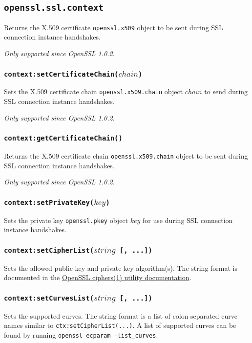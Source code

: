 \documentclass[11pt, oneside]{memoir}
\newcommand*{\fn}[1]{\texttt{#1}\xspace}
\newcommand*{\module}[1]{\texttt{#1}\xspace}
\newcounter{toccols}
\newenvironment{Module}[1]{
	\subsection{\texttt{#1}}
	\addtocontents{toc}{
		\protect\begin{multicols}{\value{toccols}}
	}
}{
	\addtocontents{toc}{\protect\end{multicols}}
}
\begin{document}
\begin{Module}{openssl.ssl.context}
Returns the X.509 certificate \module{openssl.x509} object to be sent during SSL connection instance handshakes.

\emph{Only supported since OpenSSL 1.0.2.}

\subsubsection[\fn{context:setCertificateChain}]{\fn{context:setCertificateChain($chain$)}}

Sets the X.509 certificate chain \module{openssl.x509.chain} object $chain$ to send during SSL connection instance handshakes.

\emph{Only supported since OpenSSL 1.0.2.}

\subsubsection[\fn{context:getCertificateChain}]{\fn{context:getCertificateChain()}}

Returns the X.509 certificate chain \module{openssl.x509.chain} object to be sent during SSL connection instance handshakes.

\emph{Only supported since OpenSSL 1.0.2.}

\subsubsection[\fn{context:setPrivateKey}]{\fn{context:setPrivateKey($key$)}}

Sets the private key \module{openssl.pkey} object $key$ for use during SSL connection instance handshakes.

\subsubsection[\fn{context:setCipherList}]{\fn{context:setCipherList($string$ [, ...])}}

Sets the allowed public key and private key algorithm(s). The string format is documented in the \href{http://www.openssl.org/docs/apps/ciphers.html#CIPHER_LIST_FORMAT}{OpenSSL ciphers(1) utility documentation}.

\subsubsection[\fn{context:setCurvesList}]{\fn{context:setCurvesList($string$ [, ...])}}

Sets the supported curves. The string format is a list of colon separated curve names similar to \texttt{ctx:setCipherList(...)}. A list of supported curves can be found by running \texttt{openssl ecparam -list\_curves}.


\end{Module}
\end{document}
